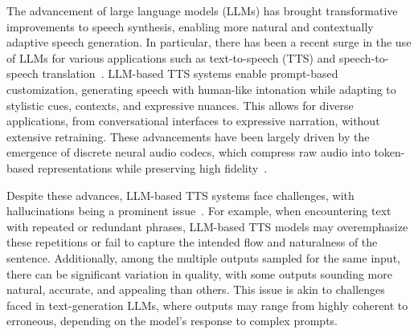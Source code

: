 





The advancement of large language models (LLMs) has brought transformative improvements to speech synthesis, enabling more natural and contextually adaptive speech generation. In particular, there has been a recent surge in the use of LLMs for various applications such as text-to-speech (TTS) and speech-to-speech translation~\cite{wang2023neural,zhang2023speak,borsos2023audiolm,t5tts,yanguniaudio,wang2024speechx}.  LLM-based TTS systems enable prompt-based customization, generating speech with human-like intonation while adapting to stylistic cues, contexts, and expressive nuances. This allows for diverse applications, from conversational interfaces to expressive narration, without extensive retraining. These advancements have been largely driven by the emergence of discrete neural audio codecs, which compress raw audio into token-based representations while preserving high fidelity~\cite{encodec,dac_kumar2024high,zeghidour2021soundstream,langman2024spectral,casanova2024low}.


Despite these advances, LLM-based TTS systems face challenges, with hallucinations being a prominent issue~\cite{sahoo2024comprehensive,song2024ella,t5tts,borsos2023audiolm}.
For example, when encountering text with repeated or redundant phrases, LLM-based TTS models may overemphasize these repetitions or fail to capture the intended flow and naturalness of the sentence. Additionally, among the multiple outputs sampled for the same input, there can be significant variation in quality, with some outputs sounding more natural, accurate, and appealing than others. This issue is akin to challenges faced in text-generation LLMs, where outputs may range from highly coherent to erroneous, depending on the model's response to complex prompts.

